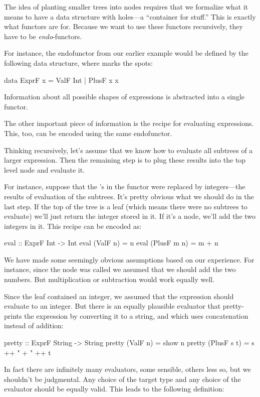 \documentclass[DaoFP]{subfiles}
\begin{document}
The idea of planting smaller trees into nodes requires that we formalize what it means to have a data structure with holes---a ``container for stuff.'' This is exactly what functors are for. Because we want to use these functors recursively, they have to be \emph{endo}-functors.

For instance, the endofunctor from our earlier example would be defined by the following data structure, where  marks the spots:
\begin{haskell}
data ExprF x = ValF Int 
             | PlusF x x
\end{haskell}
Information about all possible shapes of expressions is abstracted into a single functor. 

The other important piece of information is the recipe for evaluating expressions. This, too, can be encoded using the same endofunctor. 

Thinking recursively, let's assume that we know how to evaluate all subtrees of a larger expression. Then the remaining step is to plug these results into the top level node and evaluate it. 

For instance, suppose that the 's in the functor were replaced by integers---the results of evaluation of the subtrees. It's pretty obvious what we should do in the last step. If the top of the tree is a leaf  (which means there were no subtrees to evaluate) we'll just return the integer stored in it. If it's a  node, we'll add the two integers in it. This recipe can be encoded as:
\begin{haskell}
eval :: ExprF Int -> Int
eval (ValF n)    = n
eval (PlusF m n) = m + n
\end{haskell}

We have made some seemingly obvious assumptions based on our experience. For instance, since the node was called  we assumed that we should add the two numbers. But multiplication or subtraction would work equally well.

Since the leaf  contained an integer, we assumed that the expression should evaluate to an integer. But there is an equally plausible evaluator that pretty-prints the expression by converting it to a string, and which uses concatenation instead of addition:
\begin{haskell}
pretty :: ExprF String -> String
pretty (ValF n)    = show n
pretty (PlusF s t) = s ++ " + " ++ t
\end{haskell}

In fact there are infinitely many evaluators, some sensible, others less so, but we shouldn't be judgmental. Any choice of the target type and any choice of the evaluator should be equally valid. This leads to the following definition:
\end{document}
